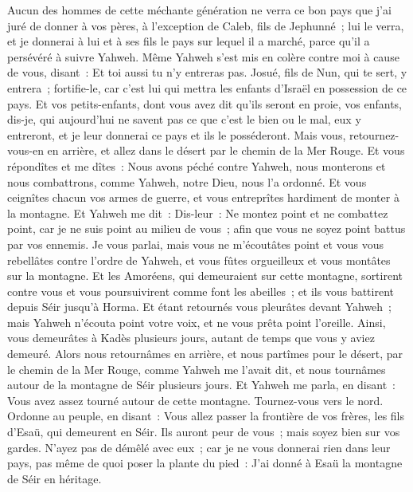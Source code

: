 \begin{multicols}{2}
Aucun des hommes de cette méchante génération ne verra ce bon pays que j'ai juré de donner à vos pères,
à l'exception de Caleb, fils de Jephunné~; lui le verra, et je donnerai à lui et à ses fils le pays sur lequel il a marché, parce qu'il a persévéré à suivre Yahweh.
Même Yahweh s'est mis en colère contre moi à cause de vous, disant~: Et toi aussi tu n'y entreras pas.
Josué, fils de Nun, qui te sert, y entrera~; fortifie-le, car c'est lui qui mettra les enfants d'Israël en possession de ce pays.
Et vos petits-enfants, dont vous avez dit qu'ils seront en proie, vos enfants, dis-je, qui aujourd'hui ne savent pas ce que c'est le bien ou le mal, eux y entreront, et je leur donnerai ce pays et ils le posséderont.
Mais vous, retournez-vous-en en arrière, et allez dans le désert par le chemin de la Mer Rouge.
Et vous répondîtes et me dîtes~: Nous avons péché contre Yahweh, nous monterons et nous combattrons, comme Yahweh, notre Dieu, nous l'a ordonné. Et vous ceignîtes chacun vos armes de guerre, et vous entreprîtes hardiment de monter à la montagne.
Et Yahweh me dit~: Dis-leur~: Ne montez point et ne combattez point, car je ne suis point au milieu de vous~; afin que vous ne soyez point battus par vos ennemis.
Je vous parlai, mais vous ne m'écoutâtes point et vous vous rebellâtes contre l'ordre de Yahweh, et vous fûtes orgueilleux et vous montâtes sur la montagne.
Et les Amoréens, qui demeuraient sur cette montagne, sortirent contre vous et vous poursuivirent comme font les abeilles~; et ils vous battirent depuis Séir jusqu'à Horma.
Et étant retournés vous pleurâtes devant Yahweh~; mais Yahweh n'écouta point votre voix, et ne vous prêta point l'oreille.
Ainsi, vous demeurâtes à Kadès plusieurs jours, autant de temps que vous y aviez demeuré.
\VerseOne{}Alors nous retournâmes en arrière, et nous partîmes pour le désert, par le chemin de la Mer Rouge, comme Yahweh me l'avait dit, et nous tournâmes autour de la montagne de Séir plusieurs jours.
Et Yahweh me parla, en disant~:
Vous avez assez tourné autour de cette montagne. Tournez-vous vers le nord.
Ordonne au peuple, en disant~: Vous allez passer la frontière de vos frères, les fils d'Esaü, qui demeurent en Séir. Ils auront peur de vous~; mais soyez bien sur vos gardes.
N'ayez pas de démêlé avec eux~; car je ne vous donnerai rien dans leur pays, pas même de quoi poser la plante du pied~: J'ai donné à Esaü la montagne de Séir en héritage.

\end{multicols}
